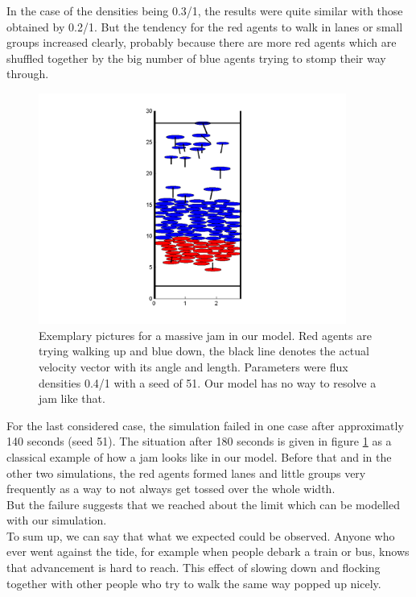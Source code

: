 \noi In the case of the densities being 0.3/1, the results were quite similar with those obtained by 0.2/1. But the tendency for the red agents to walk in lanes or small groups increased clearly, probably because there are more red agents which are shuffled together by the big number of blue agents trying to stomp their way through.\\
\begin{figure}[h!]
	\centering
		\includegraphics[width=0.90\textwidth]{pictures/up1down04seed51.png}
	\caption{Exemplary pictures for a massive jam in our model. Red agents are trying walking up and blue down, the black line denotes the actual velocity vector with its angle and length. Parameters were flux densities 0.4/1 with a seed of 51. Our model has no way to resolve a jam like that.}
	\label{fig:up1down03seed51}
\end{figure}

\noi For the last considered case, the simulation failed in one case after approximatly 140 seconds (seed 51). The situation after 180 seconds is given in figure \ref{fig:up1down03seed51} as a classical example of how a jam looks like in our model. Before that and in the other two simulations, the red agents formed lanes and little groups very frequently as a way to not always get tossed over the whole width.\\
But the failure suggests that we reached about the limit which can be modelled with our simulation.\\

\noi To sum up, we can say that what we expected could be observed. Anyone who ever went against the tide, for example when people debark a train or bus, knows that advancement is hard to reach. This effect of slowing down and flocking together with other people who try to walk the same way popped up nicely.\\
